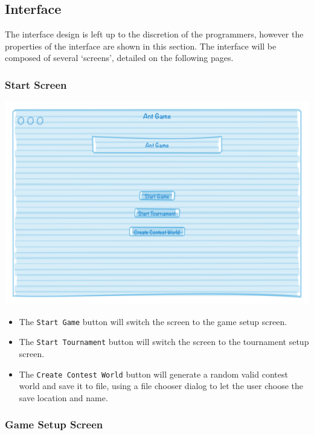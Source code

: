 \documentclass[11pt]{article}
\begin{document}
\subsection{Interface}

The interface design is left up to the discretion of the programmers, however the properties of the interface are shown in this section. The interface will be composed of several `screens', detailed on the following pages.

\subsubsection{Start Screen}

\begin{center}
\includegraphics[width=\textwidth]{low-level-diagrams/interface/start-screen}
\end{center}

\begin{itemize}
\item The \texttt{Start Game} button will switch the screen to the game setup screen.
\item The \texttt{Start Tournament} button will switch the screen to the tournament setup screen.
\item The \texttt{Create Contest World} button will generate a random valid contest world and save it to file, using a file chooser dialog to let the user choose the save location and name.
\end{itemize}

\subsubsection{Game Setup Screen}
\end{document}
